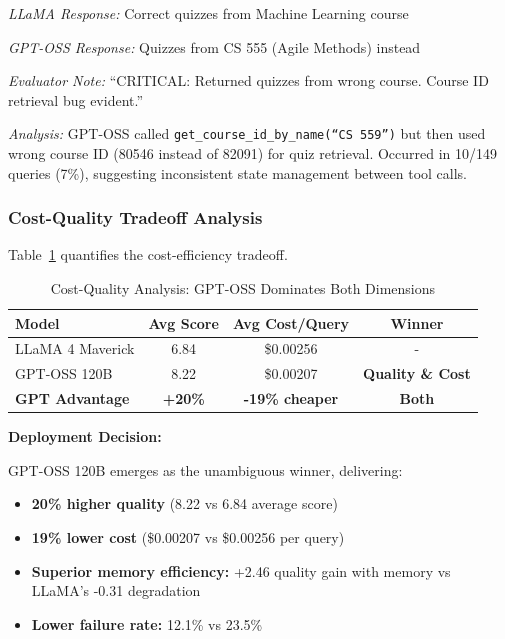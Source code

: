 \documentclass{article}
\begin{document}
\textit{LLaMA Response:} Correct quizzes from Machine Learning course

\textit{GPT-OSS Response:} Quizzes from CS 555 (Agile Methods) instead

\textit{Evaluator Note:} ``CRITICAL: Returned quizzes from wrong course. Course ID retrieval bug evident.''

\textit{Analysis:} GPT-OSS called \texttt{get\_course\_id\_by\_name(``CS 559'')} but then used wrong course ID (80546 instead of 82091) for quiz retrieval. Occurred in 10/149 queries (7\%), suggesting inconsistent state management between tool calls.

\subsubsection{Cost-Quality Tradeoff Analysis}

Table~\ref{tab:costquality} quantifies the cost-efficiency tradeoff.

\begin{table}[h]
\centering
\caption{Cost-Quality Analysis: GPT-OSS Dominates Both Dimensions}
\label{tab:costquality}
\begin{tabular}{lccc}
\toprule
\textbf{Model} & \textbf{Avg Score} & \textbf{Avg Cost/Query} & \textbf{Winner} \\
\midrule
LLaMA 4 Maverick & 6.84 & \$0.00256 & - \\
GPT-OSS 120B & 8.22 & \$0.00207 & \textbf{Quality \& Cost} \\
\midrule
\textbf{GPT Advantage} & \textbf{+20\%} & \textbf{-19\% cheaper} & \textbf{Both} \\
\bottomrule
\end{tabular}
\end{table}

\textbf{Deployment Decision:}

GPT-OSS 120B emerges as the unambiguous winner, delivering:
\begin{itemize}
    \item \textbf{20\% higher quality} (8.22 vs 6.84 average score)
    \item \textbf{19\% lower cost} (\$0.00207 vs \$0.00256 per query)
    \item \textbf{Superior memory efficiency:} +2.46 quality gain with memory vs LLaMA's -0.31 degradation
    \item \textbf{Lower failure rate:} 12.1\% vs 23.5\%
\end{itemize}
\end{document}
